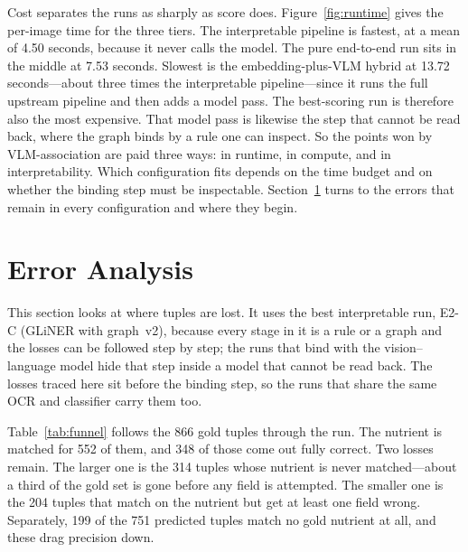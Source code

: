Cost separates the runs as sharply as score does.
Figure~\ref{fig:runtime} gives the per-image time for the three tiers. The
interpretable pipeline is fastest, at a mean of 4.50 seconds, because it
never calls the model. The pure end-to-end run sits in the middle at 7.53
seconds. Slowest is the embedding-plus-VLM hybrid at 13.72 seconds---about
three times the interpretable pipeline---since it runs the full upstream
pipeline and then adds a model pass. The best-scoring run is therefore also
the most expensive. That model pass is likewise the step that cannot be
read back, where the graph binds by a rule one can inspect. So the points
won by VLM-association are paid three ways: in runtime, in compute, and in
interpretability. Which configuration fits depends on the time budget and
on whether the binding step must be inspectable.
Section~\ref{sec:exp-error} turns to the errors that remain in every
configuration and where they begin.

\section{Error Analysis}\label{sec:exp-error}

This section looks at where tuples are lost. It uses the best interpretable
run, E2-C (GLiNER with graph~v2), because every stage in it is a rule or a
graph and the losses can be followed step by step; the runs that bind with
the vision--language model hide that step inside a model that cannot be read
back. The losses traced here sit before the binding step, so the runs that
share the same OCR and classifier carry them too.

Table~\ref{tab:funnel} follows the 866 gold tuples through the run. The
nutrient is matched for 552 of them, and 348 of those come out fully
correct. Two losses remain. The larger one is the 314 tuples whose nutrient
is never matched---about a third of the gold set is gone before any field is
attempted. The smaller one is the 204 tuples that match on the nutrient but
get at least one field wrong. Separately, 199 of the 751 predicted tuples
match no gold nutrient at all, and these drag precision down.

